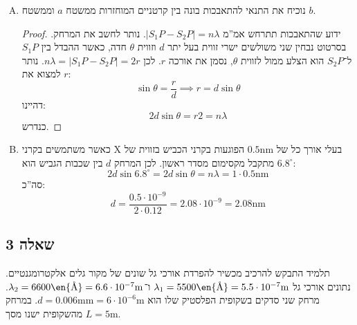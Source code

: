 \documentclass[]{../../../tex/classes/styledArticle}
\renewcommand\lg{\lambda}
\newcommand\cm{\mathrm{cm}}
\newcommand\mrm[1]{\mathrm{#1}}
\newcommand\sof[1]{|#1|}
\begin{document}
\begin{enumerate}[(A)]
		\textbf{תשובה: }בהתאם לנוסחה הקודמת, נקבל ש־$n_{\max} < \frac{1}{N^*\lg} = \frac{1}{10^{6} \cdot 1 \cdot 10^{-9}} = 1000$ ולכן $n_{\max} = 999$. סה''כ: 
		\[ N = 2 n_{\max} + 1 = 2 \cdot 999 + 1 = \bm{1999} \]
		כלומר, אותו האור מתחלק על 1999 קווי מקסימום על המסך. זוהי כמות גדולה של קווי מקסימום, ואפילו בסביבת האפס מתקיים $\Delta x= \frac{L\lg}{d} \le {2.5 \cdot 1 \cdot 10^{-9} \cdot 10^{6}} = 0.25\cm$ כלומר המרחק בין אלפי הקווים פצפון כך שקווים המקסימום מתלכדים אחד עם השני. נוסף על כך קרני X אינן בתחום האור הנראה, לכן התלמיד לא יוכל לראות אותן. 
		
		\item נוכיח את התנאי להתאבכות בונה בין קרטניים המוחזרות ממשטח $a$ וממשטח $b$. 
		
		\begin{proof}
			ידוע שהתאבכות תתרחש אמ''מ $\sof{S_1P - S_2P} = n \lg$. נותר לחשב את המרחק. בסרטוט נבחין שני משולשים ישרי זווית בעל יתר $d$ וזווית $\theta$ חדה, כאשר ההבדל בין $S_1P$ ל־$S_2P$ הוא הצלע ממול לזווית $\theta$, נסמן את אורכה $r$. לכן $n \lg = \sof{S_1P - S_2P} = 2r$. נותר למצוא את $r$: 
			\[ \sin \theta = \frac{r}{d} \implies r = d\sin \theta  \]
			דהיינו: 
			\[ 2d\sin\theta= r2 = n\lg  \]
			כנדרש. 
		\end{proof}
		\item כאשר משתמשים בקרני  X בעלי אורך כל של $0.5\mrm{nm}$ הפוגעות בקרני הכביש בזווית של $6.8^{\circ}$ מתקבל מקסימום מסדר ראשון. לכן המרחק $d$ בין שכבות הגביש הוא: 
		\[ 2d\sin 6.8^{\circ} = 2d\sin \theta = n\lg = 1 \cdot 0.5\mrm{nm} \]
		סה''כ:
		\[ d = \frac{0.5 \cdot 10^{-9}}{2 \cdot 0.12} = 2.08 \cdot 10^{-9} = \bm{2.08\mrm{nm}} \]
	\end{enumerate}
	\subsection{שאלה 3}
	תלמיד התבקש להרכיב מכשיר להפרדת אורכי גל שונים של מקור גלים אלקטרומגנטיים. נתונים אורכי גל $\lg_1 = 5500\text{\en{\AA}} = 5.5 \cdot 10^{-7} \mrm{m}$ ו־$\lg_2 = 6600\text{\en{\AA}} = 6.6\cdot 10^{-7} \mrm{m}$. מרחק שני סדקים בשקופית הפלסטיק שלו הוא $d = 0.006\mrm{mm} = 6\cdot 10^{-6} \mrm{m}$. במרחק $L = 5\mrm{m}$ מהשקופית ישנו מסך. 
	
\end{document}
